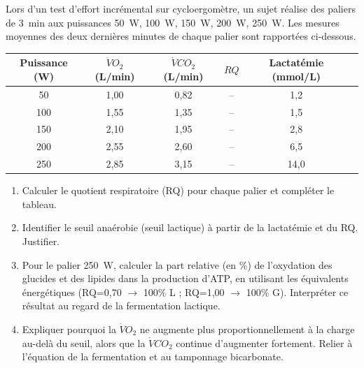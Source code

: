\documentclass[11pt]{article}
\begin{document}
\begin{exercice}
Lors d'un test d'effort incrémental sur cycloergomètre, un sujet réalise des paliers de \SI{3}{min} aux puissances \SI{50}{W}, \SI{100}{W}, \SI{150}{W}, \SI{200}{W}, \SI{250}{W}. Les mesures moyennes des deux dernières minutes de chaque palier sont rapportées ci-dessous.

\begin{tabular}{cccccc}
\hline
Puissance (W) & $\dot{V}O_2$ (L/min) & $\dot{V}CO_2$ (L/min) & $RQ$ & Lactatémie (mmol/L) \\
\hline
50  & 1,00 & 0,82 & -- & 1,2 \\
100 & 1,55 & 1,35 & -- & 1,5 \\
150 & 2,10 & 1,95 & -- & 2,8 \\
200 & 2,55 & 2,60 & -- & 6,5 \\
250 & 2,85 & 3,15 & -- & 14,0 \\
\hline
\end{tabular}

\begin{enumerate}
    \item Calculer le quotient respiratoire (RQ) pour chaque palier et compléter le tableau.
    \item Identifier le seuil anaérobie (seuil lactique) à partir de la lactatémie et du RQ. Justifier.
    \item Pour le palier \SI{250}{W}, calculer la part relative (en \%) de l'oxydation des glucides et des lipides dans la production d'ATP, en utilisant les équivalents énergétiques (RQ=0,70 $\rightarrow$ 100\% L ; RQ=1,00 $\rightarrow$ 100\% G). Interpréter ce résultat au regard de la fermentation lactique.
    \item Expliquer pourquoi la $\dot{V}O_2$ ne augmente plus proportionnellement à la charge au-delà du seuil, alors que la $\dot{V}CO_2$ continue d'augmenter fortement. Relier à l'équation de la fermentation et au tamponnage bicarbonate.
\end{enumerate}
\end{exercice}
\end{document}
